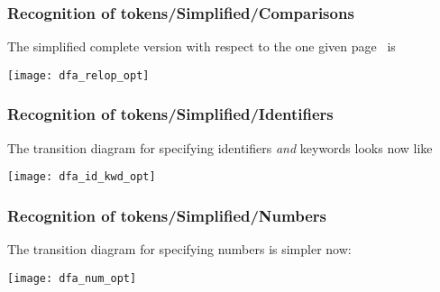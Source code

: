 % 
\begin{frame}
\frametitle{Recognition of tokens/Simplified/Comparisons}
 
The simplified complete version with respect to the one given
page~\pageref{dfa_relop} is
\begin{center}
\texttt{[image: dfa\_relop\_opt]}
\end{center}

\end{frame}

% 
\begin{frame}
\frametitle{Recognition of tokens/Simplified/Identifiers}
 
The transition diagram for specifying identifiers \emph{and} keywords
looks now like
\begin{center}
\texttt{[image: dfa\_id\_kwd\_opt]}
\end{center}

\end{frame}

% 
\begin{frame}
\frametitle{Recognition of tokens/Simplified/Numbers}
 
The transition diagram for specifying numbers is simpler now:
\begin{center}
\texttt{[image: dfa\_num\_opt]}
\end{center}

\end{frame}


